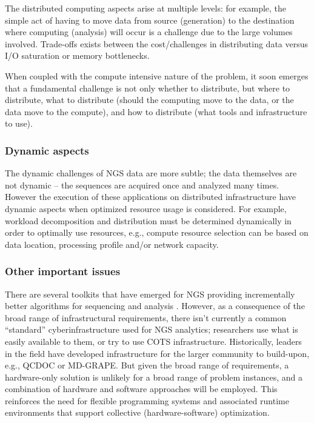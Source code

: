 The distributed computing aspects arise at multiple levels: for
example, the simple act of having to move data from source
(generation) to the destination where computing (analysis) will occur
is a challenge due to the large volumes involved. Trade-offs exists
between the cost/challenges in distributing data versus I/O
saturation or memory bottlenecks.

When coupled with the compute intensive nature of the problem, it soon
emerges that a fundamental challenge is not only whether to
distribute, but where to distribute, what to distribute (should the
computing move to the data, or the data move to the compute), and how
to distribute (what tools and infrastructure to use).

\subsubsection*{Dynamic aspects}

The dynamic challenges of NGS data are more subtle; the data
themselves are not dynamic -- the sequences are acquired once and
analyzed many times. However the execution of these applications on
distributed infrastructure have dynamic aspects when optimized
resource usage is considered. For example, workload decomposition and
distribution must be determined dynamically in order to optimally use
resources, e.g., compute resource selection can be based on data
location, processing profile and/or network capacity.

\subsubsection*{Other important issues}

There are several toolkits that have emerged for NGS providing
incrementally better algorithms for sequencing and analysis
\cite{SAMtools, BioJava, BioPerl, .NETBio}.  However, as a consequence
of the broad range of infrastructural requirements, there isn't
currently a common ``standard'' cyberinfrastructure used for NGS
analytics; researchers use what is easily available to them, or try to
use COTS infrastructure. Historically, leaders in the field have
developed infrastructure for the larger community to build-upon, e.g.,
QCDOC or MD-GRAPE. But given the broad range of requirements, a
hardware-only solution is unlikely for a broad range of problem
instances, and a combination of hardware and software approaches will
be employed. This reinforces the need for flexible programming systems
and associated runtime environments that support collective
(hardware-software) optimization.


